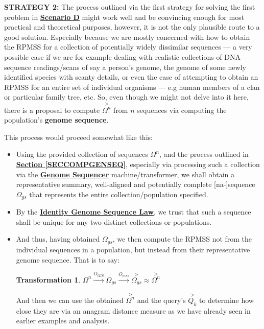 \documentclass[a4paper, 18pt]{book} %
\newtheorem{trans}{Transformation}
\begin{document}
\textbf{STRATEGY 2:} The process outlined via the first strategy for solving the first problem in \textbf{\hyperref[SECSCEND]{Scenario D}} might work well and be convincing enough for most practical and theoretical purposes, however, it is not the only plausible route to a good solution. Especially because we are mostly concerned with how to obtain the RPMSS for a collection of potentially widely dissimilar sequences --- a very possible case if we are for example dealing with realistic collections of DNA sequence readings/scans of say a person's genome, the genome of some newly identified species with scanty details, or even the case of attempting to obtain an RPMSS for an entire set of individual organisms --- e.g human members of a clan or particular family tree, etc. So, even though we might not delve into it here, there is a proposal to compute $\overset{>}{\Omega^n}$ from $n$ sequences via computing the population's \textbf{genome sequence}. 

This process would proceed somewhat like this:

\begin{itemize}
\item Using the provided collection of sequences $\Omega^n$, and the process outlined in \textbf{\hyperref[SECCOMPGENSEQ]{Section \ref{SECCOMPGENSEQ}}}, especially via processing such a collection via the \textbf{\hyperref[DEFGENOMESEQ]{Genome Sequencer}} machine/transformer, we shall obtain a representative summary, well-aligned and potentially complete [na-]sequence $\Omega_{gs}$ that represents the entire collection/population specified.
\item By the \textbf{\hyperref[LAWGDL]{Identity Genome Sequence Law}}, we trust that such a sequence shall be unique for any two distinct collections or populations.
\item {And thus, having obtained $\Omega_{gs}$, we then compute the RPMSS not from the individual sequences in a population, but instead from their representative genome sequence. That is to say:

\vspace{1em}
\begin{trans}
\label{RPMSSFROMGS}
$\Omega^n \xrightarrow{O_{tGS}} \Omega_{gs} \xrightarrow{O_{mss}} \overset{>}{\Omega_{gs}} \approx \overset{>}{\Omega^n}$
\end{trans}
\vspace{1em}

And then we can use the obtained $\overset{>}{\Omega^n}$ and the query's $\overset{>}{Q_k}$ to determine how close they are via an anagram distance measure as we have already seen in earlier examples and analysis.
}
\end{itemize}
\end{document}
